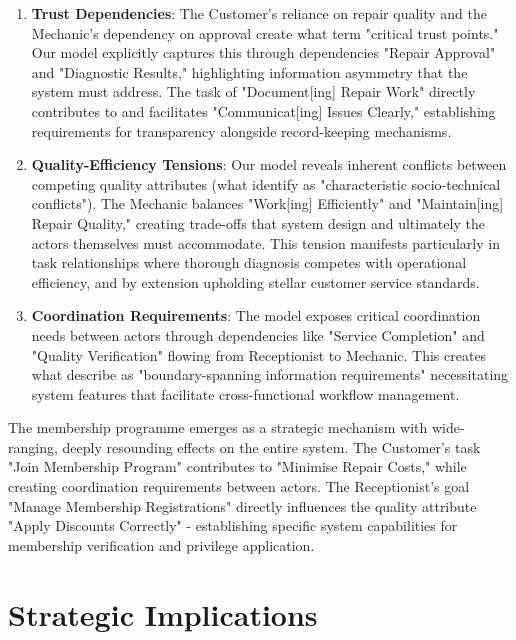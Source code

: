 \documentclass[14pt,a4paper]{article}
\begin{document}
\begin{enumerate}
  \item \textbf{Trust Dependencies}: The Customer's reliance on repair quality and the Mechanic's dependency on approval create what \textcite[p. 73]{Rifaut2020} term "critical trust points." Our model explicitly captures this through dependencies "Repair Approval" and "Diagnostic Results," highlighting information asymmetry that the system must address. The task of "Document[ing] Repair Work" directly contributes to and facilitates "Communicat[ing] Issues Clearly," establishing requirements for transparency alongside record-keeping mechanisms.

    \item \textbf{Quality-Efficiency Tensions}: Our model reveals inherent conflicts between competing quality attributes (what \textcite[p. 41]{Lezcano2022} identify as "characteristic socio-technical conflicts"). The Mechanic balances "Work[ing] Efficiently" and "Maintain[ing] Repair Quality," creating trade-offs that system design and ultimately the actors themselves must accommodate. This tension manifests particularly in task relationships where thorough diagnosis competes with operational efficiency, and by extension upholding stellar customer service standards.

    \item \textbf{Coordination Requirements}: The model exposes critical coordination needs between actors through dependencies like "Service Completion" and "Quality Verification" flowing from Receptionist to Mechanic. This creates what \textcite[p. 132]{Samavi2019} describe as "boundary-spanning information requirements" necessitating system features that facilitate cross-functional workflow management.
\end{enumerate}

The membership programme emerges as a strategic mechanism with wide-ranging, deeply resounding effects on the entire system. The Customer's task "Join Membership Program" contributes to "Minimise Repair Costs," while creating coordination requirements between actors. The Receptionist's goal "Manage Membership Registrations" directly influences the quality attribute "Apply Discounts Correctly" - establishing specific system capabilities for membership verification and privilege application.

\section{Strategic Implications}
\end{document}
